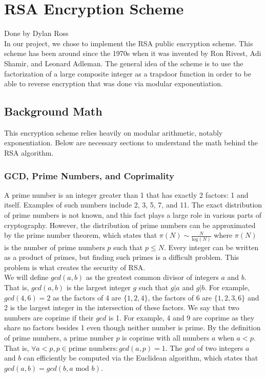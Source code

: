 \section{RSA Encryption Scheme}\label{sec:rsa}
Done by Dylan Ross\\

\medskip
	In our project, we chose to implement the RSA public encryption scheme. This scheme has been around since the 1970s when it was invented by Ron Rivest, Adi Shamir, and Leonard Adleman.
	The general idea of the scheme is to use the factorization of a large composite integer as a trapdoor function in order to be able to reverse encryption that was done via modular
	exponentiation.

	\subsection{Background Math}\label{sec:rsa-background}
		This encryption scheme relies heavily on modular arithmetic, notably exponentiation. Below are necessary sections to understand the math behind the RSA algorithm.

		\subsubsection{GCD, Prime Numbers, and Coprimality}\label{sec:rsa-gcd}
			A prime number is an integer greater than 1 that has exactly 2 factors: 1 and itself. Examples of such numbers include 2, 3, 5, 7, and 11. The exact distribution of prime numbers
			is not known, and this fact plays a large role in various parts of cryptography. However, the distribution of prime numbers can be approximated by the prime number theorem, which
			states that $\pi(N)\sim\frac{N}{\text{log}(N)}$ where $\pi(N)$ is the number of prime numbers $p$ such that $p\leq N$. Every integer can be written as a product of primes, but
			finding such primes is a difficult problem. This problem is what creates the security of RSA.\\

			We will define $gcd(a, b)$ as the greatest common divisor of integers $a$ and $b$. That is, $gcd(a, b)$ is the largest integer $g$ such that $g|a$ and $g|b$. For example, 
			$gcd(4,6)=2$ as the factors of 4 are $\{1,2,4\}$, the factors of 6 are $\{1,2,3,6\}$ and 2 is the largest integer in the intersection of these factors. We say that two numbers
			are coprime if their $gcd$ is 1. For example, 4 and 9 are coprime as they share no factors besides 1 even though neither number is prime. By the definition of prime numbers, a
			prime number $p$ is coprime with all numbers $a$ when $a<p$. That is, $\forall a<p, p\in\text{prime numbers}:gcd(a, p)=1$. The $gcd$ of two integers $a$ and $b$ can efficiently
			be computed via the Euclidean algorithm, which states that $gcd(a,b)=gcd(b,a\text{ mod }b)$.

